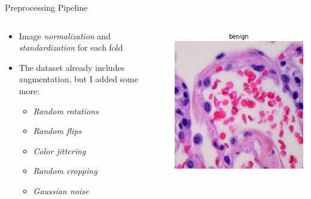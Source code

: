 \documentclass[aspectratio=169,8pt]{beamer}  %
\begin{document}
\begin{frame}{Preprocessing Pipeline}
\begin{columns}[T]
\begin{column}{0.5\textwidth}
\begin{itemize}
\item Image \emph{normalization} and \emph{standardization} for each fold
\item The dataset already includes augmentation, but I added some more:
  \begin{itemize}
  \item \emph{Random rotations}
  \item \emph{Random flips}
  \item \emph{Color jittering}
  \item \emph{Random cropping}
  \item \emph{Gaussian noise}
  \end{itemize}
\end{itemize}
\end{column}
\begin{column}{0.5\textwidth}
\hfill\includegraphics[width=0.95\linewidth, height=0.45\textheight]{imgs/normal_image.png}
\vspace{0.2cm}

\end{column}
\end{columns}
\end{frame}
\end{document}
